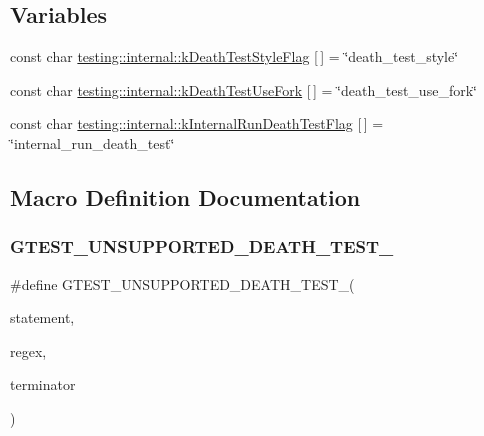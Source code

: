 \subsection*{Variables}
\begin{DoxyCompactItemize}
\item 
const char \mbox{\hyperlink{namespacetesting_1_1internal_a008ebfe0c0347d65e5e06e4d310981b3}{testing\+::internal\+::k\+Death\+Test\+Style\+Flag}} \mbox{[}$\,$\mbox{]} = \char`\"{}death\+\_\+test\+\_\+style\char`\"{}
\item 
const char \mbox{\hyperlink{namespacetesting_1_1internal_a32051e2574562b548be3e26a52eaa553}{testing\+::internal\+::k\+Death\+Test\+Use\+Fork}} \mbox{[}$\,$\mbox{]} = \char`\"{}death\+\_\+test\+\_\+use\+\_\+fork\char`\"{}
\item 
const char \mbox{\hyperlink{namespacetesting_1_1internal_a8572303d929880adf30db00952e1c45d}{testing\+::internal\+::k\+Internal\+Run\+Death\+Test\+Flag}} \mbox{[}$\,$\mbox{]} = \char`\"{}internal\+\_\+run\+\_\+death\+\_\+test\char`\"{}
\end{DoxyCompactItemize}


\subsection{Macro Definition Documentation}
\mbox{\label{gtest-death-test-internal_8h_a29a145cda8bd2d0c6a78b0ac1d670d18}} 
\subsubsection{\texorpdfstring{GTEST\_UNSUPPORTED\_DEATH\_TEST\_}{GTEST\_UNSUPPORTED\_DEATH\_TEST\_}}
{\footnotesize\ttfamily \#define G\+T\+E\+S\+T\+\_\+\+U\+N\+S\+U\+P\+P\+O\+R\+T\+E\+D\+\_\+\+D\+E\+A\+T\+H\+\_\+\+T\+E\+S\+T\+\_\+(\begin{DoxyParamCaption}\item[{}]{statement,  }\item[{}]{regex,  }\item[{}]{terminator }\end{DoxyParamCaption})}


